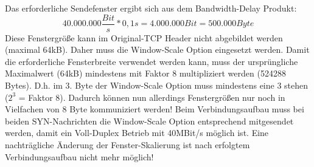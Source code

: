 Das erforderliche Sendefenster ergibt sich aus dem Bandwidth-Delay Produkt:
\[40.000.000 \frac{Bit}{s} * 0,1s = 4.000.000 Bit = 500.000 Byte\]
Diese Fenstergröße kann im Original-TCP Header nicht abgebildet werden (maximal 64kB).
Daher muss die Window-Scale Option eingesetzt werden.
Damit die erforderliche Fensterbreite verwendet werden kann, muss der ursprüngliche Maximalwert (64kB) mindestens mit Faktor 8 multipliziert werden (524288 Bytes). D.h. im 3. Byte der Window-Scale Option muss mindestens eine 3 stehen ($2^3$ = Faktor 8). Dadurch können nun allerdings Fenstergrößen nur noch in Vielfachen
von 8 Byte kommuniziert werden!
Beim Verbindungsaufbau muss bei beiden SYN-Nachrichten die Window-Scale Option entsprechend mitgesendet werden, damit ein Voll-Duplex Betrieb mit 40MBit/s möglich ist. Eine nachträgliche Änderung der Fenster-Skalierung ist nach erfolgtem Verbindungsaufbau nicht mehr möglich!
